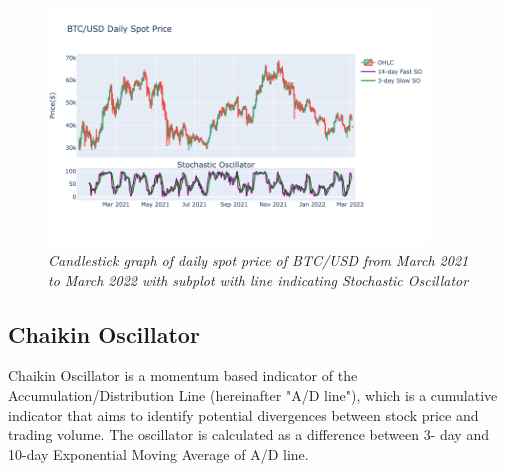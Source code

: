 \begin{figure}[ht]

\begin{center}
	\includegraphics[width=0.9\textwidth]{Figs/Stochastic.png}
\end{center}

\caption{\textit{ Candlestick graph of daily spot price of BTC/USD from March 2021 to March 2022 with subplot with line indicating Stochastic Oscillator}}

\end{figure}

\newpage

\subsection{Chaikin Oscillator}

Chaikin Oscillator is a momentum based indicator of the Accumulation/Distribution Line (hereinafter "A/D line"), which is a cumulative indicator that aims to identify potential divergences between stock price and trading volume. The oscillator is calculated as a difference between 3- day and 10-day Exponential Moving Average of A/D line. 

\vspace{0.5cm}

